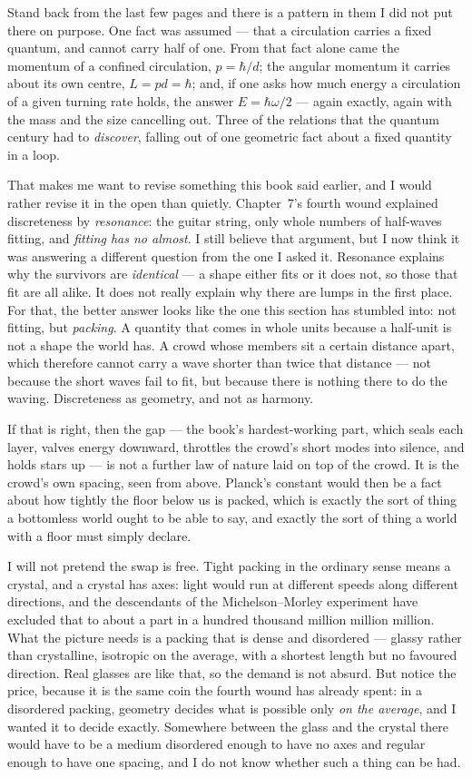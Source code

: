 Stand back from the last few pages and there is a pattern in them I did not put there on purpose. One fact was assumed --- that a circulation carries a fixed quantum, and cannot carry half of one. From that fact alone came the momentum of a confined circulation, $p = \hbar/d$; the angular momentum it carries about its own centre, $L = pd = \hbar$; and, if one asks how much energy a circulation of a given turning rate holds, the answer $E = \hbar\omega/2$ --- again exactly, again with the mass and the size cancelling out. Three of the relations that the quantum century had to \emph{discover}, falling out of one geometric fact about a fixed quantity in a loop.

That makes me want to revise something this book said earlier, and I would rather revise it in the open than quietly. Chapter~7's fourth wound explained discreteness by \emph{resonance}: the guitar string, only whole numbers of half-waves fitting, and \emph{fitting has no almost}. I still believe that argument, but I now think it was answering a different question from the one I asked it. Resonance explains why the survivors are \emph{identical} --- a shape either fits or it does not, so those that fit are all alike. It does not really explain why there are lumps in the first place. For that, the better answer looks like the one this section has stumbled into: not fitting, but \emph{packing}. A quantity that comes in whole units because a half-unit is not a shape the world has. A crowd whose members sit a certain distance apart, which therefore cannot carry a wave shorter than twice that distance --- not because the short waves fail to fit, but because there is nothing there to do the waving. Discreteness as geometry, and not as harmony.

If that is right, then the gap --- the book's hardest-working part, which seals each layer, valves energy downward, throttles the crowd's short modes into silence, and holds stars up --- is not a further law of nature laid on top of the crowd. It is the crowd's own spacing, seen from above. Planck's constant would then be a fact about how tightly the floor below us is packed, which is exactly the sort of thing a bottomless world ought to be able to say, and exactly the sort of thing a world with a floor must simply declare.

I will not pretend the swap is free. Tight packing in the ordinary sense means a crystal, and a crystal has axes: light would run at different speeds along different directions, and the descendants of the Michelson--Morley experiment have excluded that to about a part in a hundred thousand million million million. What the picture needs is a packing that is dense and disordered --- glassy rather than crystalline, isotropic on the average, with a shortest length but no favoured direction. Real glasses are like that, so the demand is not absurd. But notice the price, because it is the same coin the fourth wound has already spent: in a disordered packing, geometry decides what is possible only \emph{on the average}, and I wanted it to decide exactly. Somewhere between the glass and the crystal there would have to be a medium disordered enough to have no axes and regular enough to have one spacing, and I do not know whether such a thing can be had.


